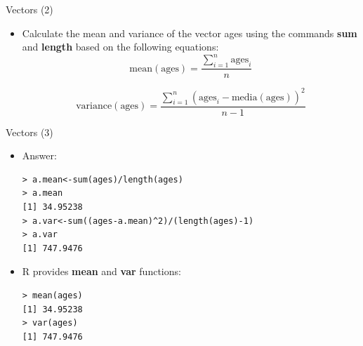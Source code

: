 \documentclass[handout]{beamer}
\begin{document}
\begin{frame}[fragile]{Vectors (2)}
\scriptsize{
\begin{itemize}
 \item Calculate the mean and variance of the vector ages using the commands \textbf{sum} and \textbf{length} based on the following equations:
 \begin{equation}
  \text{mean}(\text{ages})=\frac{\sum_{i=1}^n\text{ages}_{i}}{n}
 \end{equation}
 
 \begin{equation}
 \text{variance}(\text{ages})=\frac{\sum_{i=1}^n(\text{ages}_{i}-\text{media}(\text{ages}))^2 }{n-1} 
 \end{equation}

 
\end{itemize}



}

 
\end{frame}



\begin{frame}[fragile]{Vectors (3)}
\scriptsize{
\begin{itemize}
 \item Answer:
 \begin{verbatim}
> a.mean<-sum(ages)/length(ages)
> a.mean
[1] 34.95238
> a.var<-sum((ages-a.mean)^2)/(length(ages)-1)
> a.var
[1] 747.9476
 \end{verbatim}
 
 \item R provides \textbf{mean} and \textbf{var} functions:
 \begin{verbatim}
> mean(ages)
[1] 34.95238
> var(ages)
[1] 747.9476

 \end{verbatim}
 
\end{itemize}



}

 
\end{frame}
 
\end{document}
